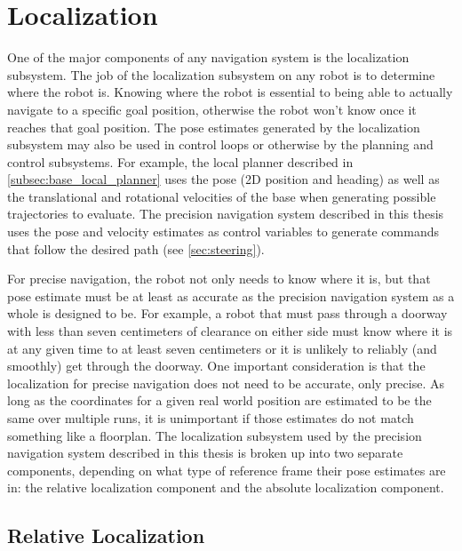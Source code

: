\section{Localization}\label{sec:localization}

One of the major components of any navigation system is the localization subsystem. The job of the localization subsystem on any robot is to determine where the robot is. Knowing where the robot is essential to being able to actually navigate to a specific goal position, otherwise the robot won't know once it reaches that goal position. The pose estimates generated by the localization subsystem may also be used in control loops or otherwise by the planning and control subsystems. For example, the local planner described in \autoref{subsec:base_local_planner} uses the pose (2D position and heading) as well as the translational and rotational velocities of the base when generating possible trajectories to evaluate. The precision navigation system described in this thesis uses the pose and velocity estimates as control variables to generate commands that follow the desired path (see \autoref{sec:steering}).

For precise navigation, the robot not only needs to know where it is, but that pose estimate must be at least as accurate as the precision navigation system as a whole is designed to be. For example, a robot that must pass through a doorway with less than seven centimeters of clearance on either side must know where it is at any given time to at least seven centimeters or it is unlikely to reliably (and smoothly) get through the doorway. One important consideration is that the localization for precise navigation does not need to be accurate, only precise. As long as the coordinates for a given real world position are estimated to be the same over multiple runs, it is unimportant if those estimates do not match something like a floorplan. The localization subsystem used by the precision navigation system described in this thesis is broken up into two separate components, depending on what type of reference frame their pose estimates are in: the relative localization component and the absolute localization component.

\subsection{Relative Localization}\label{subsec:relative_localization}

